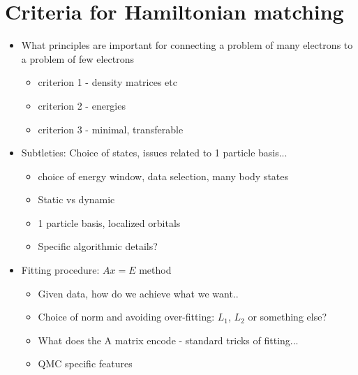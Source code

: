 \documentclass[prl,12pt,onecolumn,nofootinbib,notitlepage,english,superscriptaddress]{revtex4-1}
\newcommand{\HJC}[1]{{\color{RED}{\bf HJC: #1}}}
\newcommand{\lucas}[1]{{\color{GREEN}{\bf LKW: #1}}}
\begin{document}
 
\section{Criteria for Hamiltonian matching}
\begin{itemize}
\item What principles are important for connecting a problem of many electrons to a problem of few electrons
\HJC{Discuss what metrics are being matched. Give details} 
\lucas{Why do we choose these criteria? What are the advantages of these criteria versus say matching the spectrum? }
    \begin{itemize}
    \item criterion 1 - density matrices etc
    \item criterion 2 - energies
    \item criterion 3 - minimal, transferable
    \HJC {What kind of data is needed and how much is enough}
    \end{itemize}

\item Subtleties: Choice of states, issues related to 1 particle basis...
	\begin{itemize}
	\item choice of energy window, data selection, many body states
	\item Static vs dynamic
	\item 1 particle basis, localized orbitals
	\item Specific algorithmic details?
	\end{itemize}

\item Fitting procedure: $Ax=E$ method
	\begin{itemize}
	\item Given data, how do we achieve what we want..
	\item Choice of norm and avoiding over-fitting: $L_1$, $L_2$ or something else? \lucas{We often use a technique called 'matching pursuit'} 
	\item What does the A matrix encode - standard tricks of fitting...
	\item QMC specific features
	
	\end{itemize}
	

\end{itemize}
\end{document}
